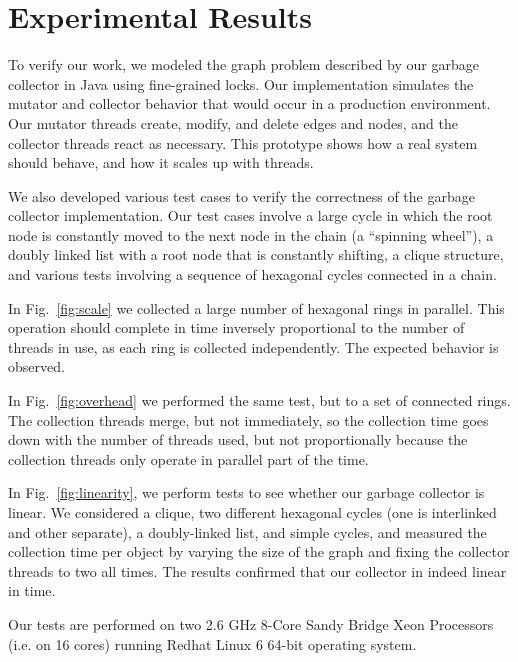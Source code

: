 \section{Experimental Results}
\label{section:experimental}
To verify our work, we modeled the graph problem described by our garbage
collector in Java using fine-grained locks. Our implementation simulates the mutator and collector
behavior that would occur in a production environment. Our mutator threads create, modify, and
delete edges and nodes, and the collector threads react as necessary. This prototype
shows how a real system should behave, and how it scales up with threads.

We also developed various test cases to verify the correctness of the garbage
collector implementation. Our test cases involve a large cycle in which the root
node is constantly moved to the next node in the chain (a ``spinning wheel''), a doubly linked list
with a root node that is constantly shifting, a clique structure, and various
tests involving a sequence of hexagonal cycles connected in a chain.

In Fig.~\ref{fig:scale} we
collected a large number of hexagonal rings in parallel. This
operation should complete in time inversely proportional to the number of threads
in use, as each ring is collected
independently. The expected behavior is observed.

In Fig.~\ref{fig:overhead} we performed the same test, but to a set
of connected rings. The collection threads
merge, but not immediately, so the collection time goes down with the number of
threads used, but not proportionally because the
collection threads only operate in parallel part of the time.

In Fig.~\ref{fig:linearity}, we perform tests to see whether our garbage
collector is linear. We considered a clique, two different hexagonal cycles (one
is interlinked and other separate), a doubly-linked list, and simple cycles, and
measured the collection time per object by varying the size of the graph and
fixing the collector threads to two all times. The results confirmed that our
collector in indeed linear in time.

Our tests are performed on two 2.6 GHz 8-Core Sandy Bridge Xeon Processors (i.e.
on 16 cores) running Redhat Linux 6 64-bit operating system.

